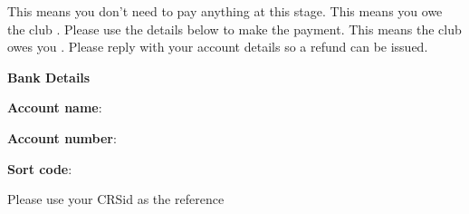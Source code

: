 \documentclass[british]{letter}
\begin{document}
\vspace{0.7 cm}

\large
{}
This means you don't need to pay anything at this stage.
This means you owe the club . Please use the details below to make the payment.
This means the club owes you . Please reply with your account details so a refund can be issued.

\vspace{0.5 cm}

\begin{minipage}{\textwidth}

\Large\textbf{Bank Details}

\vspace{0.3cm}

\large\textbf{Account name}: 

\textbf{Account number}: 

\textbf{Sort code}: 

Please use your CRSid as the reference

\end{minipage}

\vspace{0.1 cm}
\end{document}
